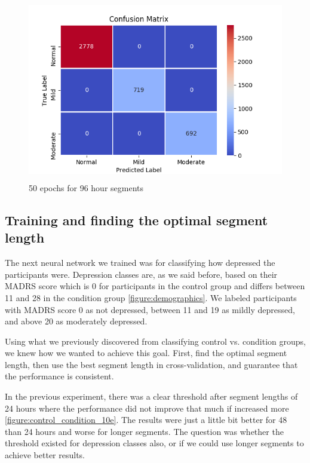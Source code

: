 \begin{figure}
      \includegraphics[height=8cm]{img/depression_class/conf_5760_60_50_32.png}
      \caption{50 epochs for 96 hour segments}
      \label{figure:depression_class_confusion_matrix_96h}
\end{figure}

\subsection{Training and finding the optimal segment length}

The next neural network we trained was for classifying how depressed the participants were. Depression classes are, as we said before, 
based on their MADRS score which is 0 for participants in the control group and differs between 11 and 28 in the condition group \ref{figure:demographics}. We labeled participants with MADRS score 0 as not depressed, between 11 and 19 as mildly depressed, and above 20 as moderately depressed. 

Using what we previously discovered from classifying control vs. condition groups, we knew how we wanted to achieve this goal. First, find the optimal segment length, then use the best segment length in cross-validation, and guarantee that the performance is consistent. 

In the previous experiment, there was a clear threshold after segment lengths of 24 hours where the performance did not improve that much if increased more \ref{figure:control_condition_10e}. The results were just a little bit better for 48 than 24 hours and worse for longer segments. The question was whether the threshold existed for depression classes also, or if we could use longer segments to achieve better results.

